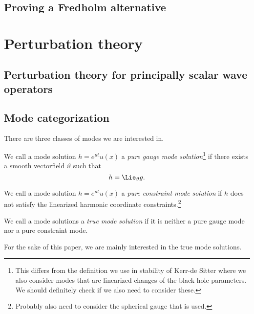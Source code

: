 \documentclass{article}
\begin{document}
\subsection{Proving a Fredholm alternative}

\section{Perturbation theory}

\subsection{Perturbation theory for principally scalar wave operators}

\subsection{Mode categorization}

There are three classes of modes we are interested in.
\begin{definition}
  We call a mode solution $h = e^{\mu t}u(x)$ a \emph{pure gauge mode
    solution}\footnote{This differs from the definition we use in
    stability of Kerr-de Sitter where we also consider modes that are
    linearized changes of the black hole parameters. We should
    definitely check if we also need to consider these.} if there exists a smooth vectorfield
  $\vartheta$ such that
  \begin{equation*}
    h = \Lie_{\vartheta}g.
  \end{equation*}
\end{definition}

\begin{definition}
  We call a mode solution $h = e^{\mu t}u(x)$ a \emph{pure constraint
    mode solution} if $h$ does not satisfy the linearized harmonic
  coordinate constraints.\footnote{Probably also need to consider the
    spherical gauge that is used.}
\end{definition}

\begin{definition}
  We call a mode solutions a \emph{true mode solution} if it is
  neither a pure gauge mode nor a pure constraint mode. 
\end{definition}

For the sake of this paper, we are mainly interested in the true mode
solutions.
\end{document}
